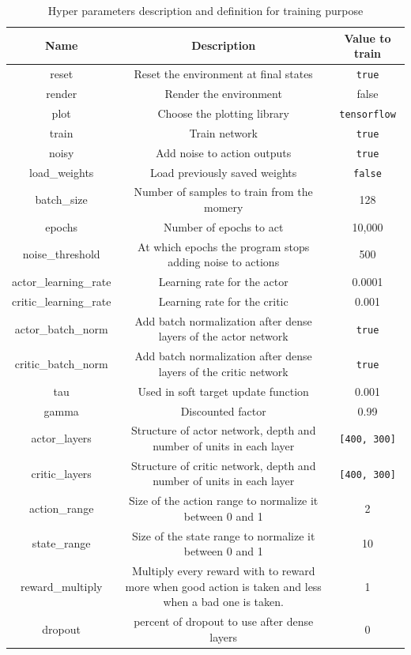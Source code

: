 \documentclass{article}
\begin{document}
\begin{table}[ht]
  \centering
  \begin{adjustbox}{width=1\textwidth}
    \begin{tabular}{ |c|c|c| }
      \hline
      \textbf{Name} & \textbf{Description} & \textbf{Value to train} \\
      \hline
      reset & Reset the environment at final states & \verb?true? \\ 
      render & Render the environment\footnotemark & false \\
      plot & Choose the plotting library & \verb?tensorflow? \\
      train & Train network & \verb?true? \\
      noisy & Add noise to action outputs & \verb?true? \\
      load\_weights & Load previously saved weights & \verb?false? \\
      batch\_size & Number of samples to train from the momery & 128 \\
      epochs & Number of epochs to act & 10,000 \\
      noise\_threshold & At which epochs the program stops adding noise to actions & 500 \\
      actor\_learning\_rate & Learning rate for the actor & 0.0001 \\
      critic\_learning\_rate & Learning rate for the critic & 0.001 \\
      actor\_batch\_norm & Add batch normalization after dense layers of the actor network & \verb?true? \\
      critic\_batch\_norm & Add batch normalization after dense layers of the critic network & \verb?true? \\
      tau & Used in soft target update function & 0.001 \\
      gamma & Discounted factor & 0.99 \\
      actor\_layers & Structure of actor network, depth and number of units in each layer & \verb?[400, 300]? \\
      critic\_layers & Structure of critic network, depth and number of units in each layer & \verb?[400, 300]? \\
      action\_range & Size of the action range to normalize it between 0 and 1 & 2 \\
      state\_range & Size of the state range to normalize it between 0 and 1 & 10 \\
      reward\_multiply & Multiply every reward with to reward more when good action is taken and less when a bad one is taken. & 1 \\
      dropout & percent of dropout to use after dense layers & 0 \\
      \hline
    \end{tabular}
  \end{adjustbox}
  \caption{Hyper parameters description and definition for training purpose}
  \label{tab:hyperparams}
\end{table}
\end{document}
